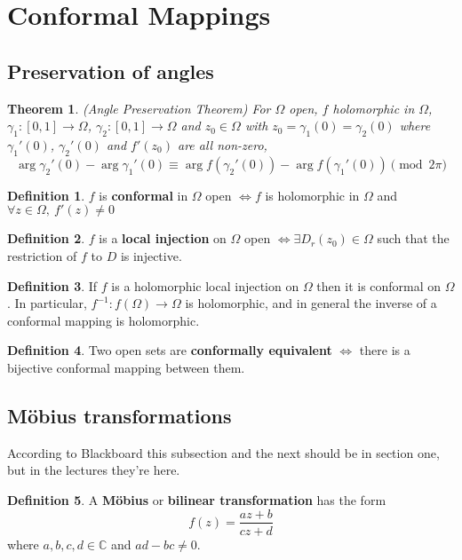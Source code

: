\documentclass[12pt]{article}
\newtheorem{thm}{Theorem}[section]
\theoremstyle{definition}
\newtheorem{defn}{Definition}[section]
\newcommand{\C}{\mathbb{C}}
\begin{document}
\section{Conformal Mappings}

\subsection{Preservation of angles}

\begin{thm}
  (Angle Preservation Theorem)
  For $\Omega$ open, $f$ holomorphic in $\Omega$, $\gamma_1 : [0, 1] \to \Omega$, $\gamma_2 : [0, 1] \to \Omega$ and $z_0 \in \Omega$ with $z_0 = \gamma_1(0) = \gamma_2(0)$ where $\gamma_1'(0)$, $\gamma_2'(0)$ and $f'(z_0)$ are all non-zero,
  $$\arg{\gamma_2'(0)} - \arg{\gamma_1'(0)} \equiv \arg{f(\gamma_2'(0))} - \arg{f(\gamma_1'(0))} \pmod {2\pi}$$
\end{thm}

\begin{defn}
  $f$ is \textbf{conformal} in $\Omega$ open $\iff f$ is holomorphic in $\Omega$ and $\forall z \in \Omega,\ f'(z) \neq 0$
\end{defn}

\begin{defn}
  $f$ is a \textbf{local injection} on $\Omega$ open $\iff \exists D_r(z_0) \in \Omega$ such that the restriction of $f$ to $D$ is injective.
\end{defn}

\begin{defn}
  If $f$ is a holomorphic local injection on $\Omega$ then it is conformal on $\Omega$.
  In particular, $f^{-1} : f(\Omega) \to \Omega$ is holomorphic, and in general the inverse of a conformal mapping is holomorphic.
\end{defn}

\begin{defn}
  Two open sets are \textbf{conformally equivalent} $\iff$ there is a bijective conformal mapping between them.
\end{defn}

\subsection{M\"obius transformations}

According to Blackboard this subsection and the next should be in section one, but in the lectures they're here.

\begin{defn}
  A \textbf{M\"obius} or \textbf{bilinear transformation} has the form
  $$f(z) = \frac{az + b}{cz + d}$$
  where $a, b, c, d \in \C$ and $ad - bc \neq 0$.
\end{defn}
\end{document}
